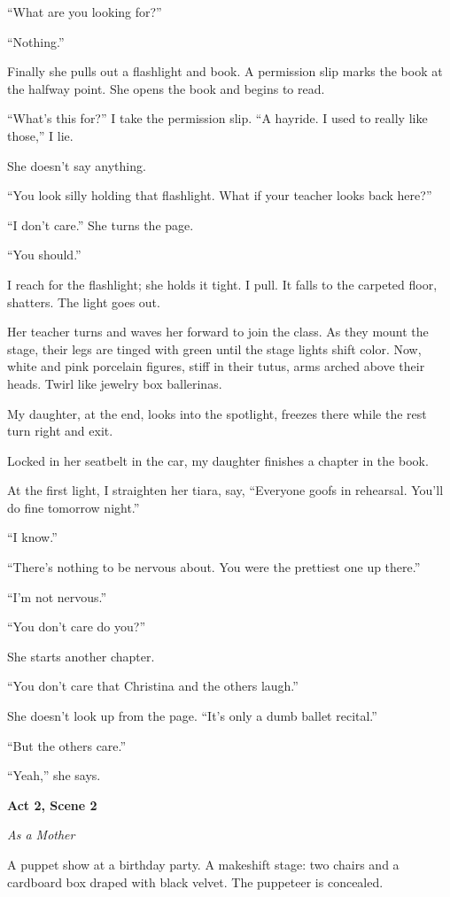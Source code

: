 \documentclass[
]{article}
\begin{document}
``What are you looking for?''

``Nothing.''

Finally she pulls out a flashlight and book. A permission slip marks the
book at the halfway point. She opens the book and begins to read.

``What's this for?'' I take the permission slip. ``A hayride. I used to
really like those,'' I lie.

She doesn't say anything.

``You look silly holding that flashlight. What if your teacher looks
back here?''

``I don't care.'' She turns the page.

``You should.''

I reach for the flashlight; she holds it tight. I pull. It falls to the
carpeted floor, shatters. The light goes out.

Her teacher turns and waves her forward to join the class. As they mount
the stage, their legs are tinged with green until the stage lights shift
color. Now, white and pink porcelain figures, stiff in their tutus, arms
arched above their heads. Twirl like jewelry box ballerinas.

My daughter, at the end, looks into the spotlight, freezes there while
the rest turn right and exit.

Locked in her seatbelt in the car, my daughter finishes a chapter in the
book.

At the first light, I straighten her tiara, say, ``Everyone goofs in
rehearsal. You'll do fine tomorrow night.''

``I know.''

``There's nothing to be nervous about. You were the prettiest one up
there.''

``I'm not nervous.''

``You don't care do you?''

She starts another chapter.

``You don't care that Christina and the others laugh.''

She doesn't look up from the page. ``It's only a dumb ballet recital.''

``But the others care.''

``Yeah,'' she says.

\textbf{Act 2, Scene 2}

\emph{As a Mother}

A puppet show at a birthday party. A makeshift stage: two chairs and a
cardboard box draped with black velvet. The puppeteer is concealed.
\end{document}
